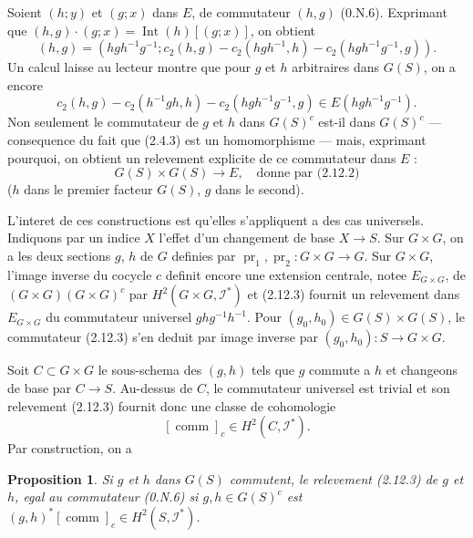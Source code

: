 \documentclass[11pt,a4paper]{article}
\theoremstyle{plain}
\newtheorem{proposition}[theorem]{Proposition}
\theoremstyle{definition}
\DeclareMathOperator{\Int}{Int}
\DeclareMathOperator{\pr}{pr}
\DeclareMathOperator{\comm}{comm}
\begin{document}
Soient $(h; y)$ et $(g; x)$ dans $E$, de commutateur $(h, g)$ (0.N.6). Exprimant que $(h, g) \cdot (g; x) = \Int(h)[(g; x)]$, on obtient
\begin{equation}\label{2.12.2}
(h, g) = (hgh^{-1}g^{-1}; c_2(h, g) - c_2(hgh^{-1}, h) - c_2(hgh^{-1}g^{-1}, g)).
\end{equation}
Un calcul laisse au lecteur montre que pour $g$ et $h$ arbitraires dans $G(S)$, on a encore
\[
c_2(h, g) - c_2(h^{-1}gh, h) - c_2(hgh^{-1}g^{-1}, g) \in E(hgh^{-1}g^{-1}).
\]
Non seulement le commutateur de $g$ et $h$ dans $G(S)^c$ est-il dans $G(S)^c$ --- consequence du fait que (2.4.3) est un homomorphisme --- mais, exprimant pourquoi, on obtient un relevement explicite de ce commutateur dans $E$ :
\begin{equation}\label{2.12.3}
G(S) \times G(S) \to E, \quad \text{donne par (2.12.2)}
\end{equation}
($h$ dans le premier facteur $G(S)$, $g$ dans le second).

L'interet de ces constructions est qu'elles s'appliquent a des cas universels. Indiquons par un indice $X$ l'effet d'un changement de base $X \to S$. Sur $G \times G$, on a les deux sections $g$, $h$ de $G$ definies par $\pr_1, \pr_2 : G \times G \to G$. Sur $G \times G$, l'image inverse du cocycle $c$ definit encore une extension centrale, notee $E_{G \times G}$, de $(G \times G)(G \times G)^c$ par $H^2(G \times G, \mathscr{I}^*)$ et (2.12.3) fournit un relevement dans $E_{G \times G}$ du commutateur universel $ghg^{-1}h^{-1}$. Pour $(g_0, h_0) \in G(S) \times G(S)$, le commutateur (2.12.3) s'en deduit par image inverse par $(g_0, h_0) : S \to G \times G$.

Soit $C \subset G \times G$ le sous-schema des $(g, h)$ tels que $g$ commute a $h$ et changeons de base par $C \to S$. Au-dessus de $C$, le commutateur universel est trivial et son relevement (2.12.3) fournit donc une classe de cohomologie
\begin{equation}\label{2.12.4}
[\comm]_c \in H^2(C, \mathscr{I}^*).
\end{equation}
Par construction, on a
\begin{proposition}\label{2.13}
Si $g$ et $h$ dans $G(S)$ commutent, le relevement (2.12.3) de $g$ et $h$, egal au commutateur (0.N.6) si $g, h \in G(S)^c$ est $(g, h)^*[\comm]_c \in H^2(S, \mathscr{I}^*)$.
\end{proposition}

\subsection{}\label{2.14}
\end{document}
